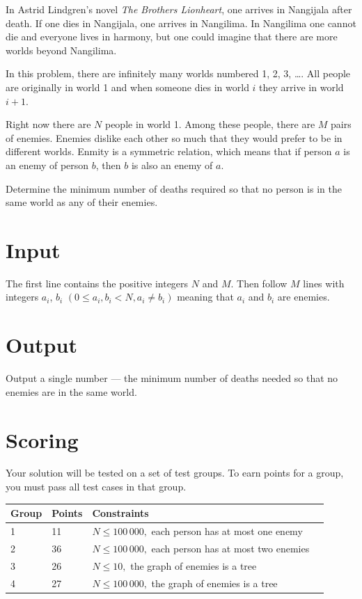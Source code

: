 \def\version{1}
In Astrid Lindgren's novel \emph{The Brothers Lionheart}, one arrives in Nangijala after death. If one dies in Nangijala, one arrives in Nangilima. In Nangilima one cannot die and everyone lives in harmony, but one could imagine that there are more worlds beyond Nangilima.

In this problem, there are infinitely many worlds numbered 1, 2, 3, \dots. All people are originally in world 1 and when someone dies in world $i$ they arrive in world $i+1$.

Right now there are $N$ people in world 1. Among these people, there are $M$ pairs of enemies. Enemies dislike each other so much that they would prefer to be in different worlds. Enmity is a symmetric relation, which means that if person $a$ is an enemy of person $b$, then $b$ is also an enemy of $a$.

Determine the minimum number of deaths required so that no person is in the same world as any of their enemies.

\section*{Input}
The first line contains the positive integers $N$ and $M$.
Then follow $M$ lines with integers $a_i$, $b_i$ $(0 \le a_i, b_i < N, a_i \neq b_i)$ meaning that $a_i$ and $b_i$ are enemies.

\section*{Output}
Output a single number --- the minimum number of deaths needed so that no enemies are in the same world.

\section*{Scoring}
Your solution will be tested on a set of test groups. To earn points for a group, you must pass all test cases in that group.

\noindent
\begin{tabular}{| l | l | l | l |}
\hline
Group & Points & Constraints \\ \hline
	1     & 11 & $N \le 100\,000,$ each person has at most one enemy \\ \hline
	2     & 36 & $N \le 100\,000,$ each person has at most two enemies  \\ \hline
	3     & 26 & $N \le 10,$ the graph of enemies is a tree \\ \hline
	4     & 27 & $N \le 100\,000,$ the graph of enemies is a tree \\ \hline
\end{tabular}
